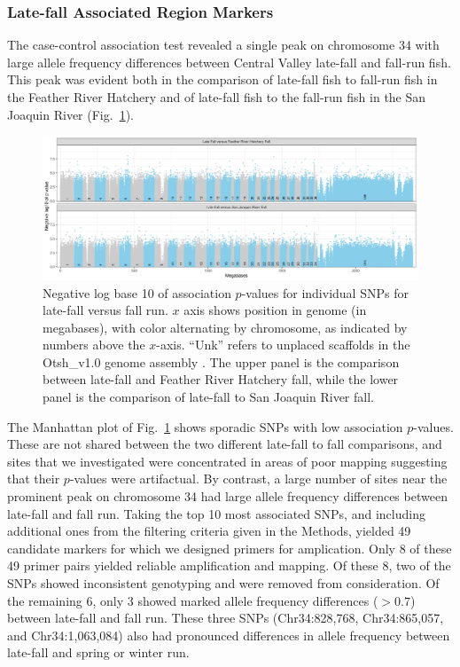 \subsubsection*{Late-fall Associated Region Markers}

The case-control association test revealed a single peak on chromosome 34 with large allele frequency differences
between Central Valley late-fall and fall-run fish.  This peak was evident both in the comparison of
late-fall fish to fall-run fish in the Feather River Hatchery and of late-fall fish to the fall-run fish in
the San Joaquin River (Fig.~\ref{fig:lfar-assoc}).
\begin{figure}
\newcommand{\lfarcap}{\footnotesize Negative log base 10 of association $p$-values for
individual SNPs for late-fall versus fall run.  $x$ axis shows position in genome (in megabases),
with color alternating by chromosome, as indicated by numbers above the $x$-axis. ``Unk'' refers
to unplaced scaffolds in the Otsh\_v1.0 genome assembly \citep{christensen2018chinook}. The 
upper panel is the comparison between late-fall and Feather River Hatchery fall, while the lower 
panel is the comparison of late-fall to San Joaquin River fall. }
\includegraphics[width=\textwidth]{images/lfar-assoc-faceted.jpg}
\caption[\lfarcap]{\lfarcap}
\label{fig:lfar-assoc}
\end{figure}
The Manhattan plot of Fig.~\ref{fig:lfar-assoc} shows sporadic SNPs with low association
$p$-values.  These are not shared between the two different late-fall to fall comparisons, and
sites that we investigated were concentrated in areas of poor mapping suggesting that their
$p$-values were artifactual.  By contrast, a large number of sites near the prominent peak on
chromosome 34 had large allele frequency differences between late-fall and fall run.  Taking the
top 10 most associated SNPs, and including additional ones from the filtering criteria given in the
Methods, yielded 49 candidate markers for which we designed primers for amplication.  Only 8
of these 49 primer pairs yielded reliable amplification and mapping.   Of these 8, two of the SNPs 
showed inconsistent genotyping and were removed from consideration.  Of the remaining 6, only 3 
showed marked allele frequency differences ($> 0.7$) between late-fall and fall run.  These three 
SNPs (Chr34:828,768,  Chr34:865,057, and Chr34:1,063,084) also had pronounced differences in 
allele frequency between 
late-fall and spring or winter run.

